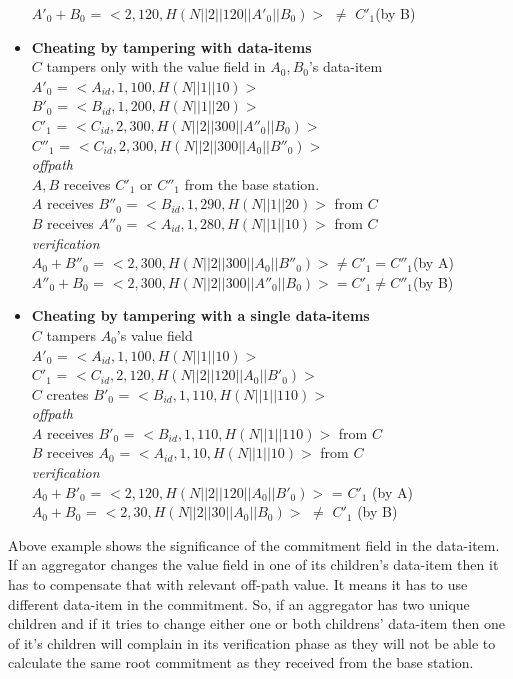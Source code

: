 \begin{exmp}
\begin{itemize}
			$A'_{0}+B_{0}$ = $<2,120,H(N||2||120||A'_{0}||B_{0})>$ $\neq$ $C'_{1}$(by B)\\
	\item \textbf{Cheating by tampering with data-items}\\
		$C$ tampers only with the value field in $A_{0},B_{0}$'s data-item\\
		$A'_{0}$ = $<A_{id},1,100, H(N||1||10)>$\\
		$B'_{0}$ = $<B_{id},1,200, H(N||1||20)>$\\
		$C'_{1}$ = $<C_{id},2,300, H(N||2||300||A''_{0}||B_{0})>$\\
		$C''_{1}$ = $<C_{id},2,300, H(N||2||300||A_{0}||B''_{0})>$\\
		\textit{offpath}\\
		$A,B$ receives $C'_{1}$ or $C''_{1}$ from the base station.\\
		$A$ receives $B''_{0}$ = $<B_{id},1,290,H(N||1||20)>$ from $C$\\
		$B$ receives $A''_{0}$ = $<A_{id},1,280,H(N||1||10)>$ from $C$\\
		\textit{verification}\\
		$A_{0}+B''_{0}$ = $<2,300,H(N||2||300||A_{0}||B''_{0})> \neq C'_{1} = C''_{1}$(by A)\\
		$A''_{0}+B_{0}$ = $<2,300,H(N||2||300||A''_{0}||B_{0})> = C'_{1} \neq C''_{1}$(by B)\\
	\item \textbf{Cheating by tampering with a single data-items}\\
		$C$ tampers $A_{0}$'s value field\\
		$A'_{0}$ = $<A_{id},1,100, H(N||1||10)>$\\
		$C'_{1}$ = $<C_{id},2,120, H(N||2||120||A_{0}||B'_{0})>$\\
		$C$ creates $B'_{0}$ = $<B_{id},1,110, H(N||1||110)>$\\
		\textit{offpath}\\
		$A$ receives $B'_{0}$ = $<B_{id},1,110, H(N||1||110)>$ from $C$\\
		$B$ receives $A_{0}$ = $<A_{id},1,10,H(N||1||10)>$ from $C$\\
		\textit{verification}\\
		$A_{0}+B'_{0}$ = $<2,120,H(N||2||120||A_{0}||B'_{0})>$ = $C'_{1}$ (by A)\\
		$A_{0}+B_{0}$ = $<2,30,H(N||2||30||A_{0}||B_{0})>$ $\neq$ $C'_{1} $ (by B)\\
	\end{itemize}
	\end{exmp}
Above example shows the significance of the commitment field in the data-item.
If an aggregator changes the value field in one of its children's data-item then it has to compensate that with relevant off-path value. 
It means it has to use different data-item in the commitment.
So, if an aggregator has two unique children and if it tries to change either one or both childrens' data-item then one of it's children will complain in its verification phase as they will not be able to calculate the same root commitment as they received from the base station.

